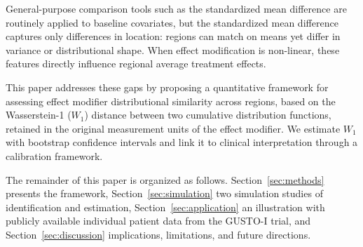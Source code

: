 \documentclass[AMA,Times1COL]{WileyNJDv5}
\begin{document}
General-purpose comparison tools such as the standardized mean difference are routinely applied to baseline covariates,\cite{austin2011} but the standardized mean difference captures only differences in location: regions can match on means yet differ in variance or distributional shape. When effect modification is non-linear, these features directly influence regional average treatment effects.

This paper addresses these gaps by proposing a quantitative framework for assessing effect modifier distributional similarity across regions, based on the Wasserstein-1 ($W_1$) distance between two cumulative distribution functions, retained in the original measurement units of the effect modifier. We estimate $W_1$ with bootstrap confidence intervals and link it to clinical interpretation through a calibration framework.

The remainder of this paper is organized as follows. Section~\ref{sec:methods} presents the framework, Section~\ref{sec:simulation} two simulation studies of identification and estimation, Section~\ref{sec:application} an illustration with publicly available individual patient data from the GUSTO-I trial, and Section~\ref{sec:discussion} implications, limitations, and future directions.
\end{document}
